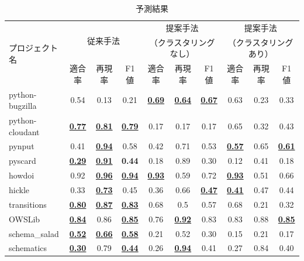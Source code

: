 \documentclass[T,J]{fose} %
\begin{document}
\begin{table}[t]
    \centering
    \caption{予測結果}
    \label{PrevPrediction}
    \begin{tabular}{l|ccc|ccc|ccc}
         \hline
         \multirow{3}{*}{プロジェクト名}&\multicolumn{3}{c|}{\multirow{2}{*}{従来手法}} & \multicolumn{3}{c|}{提案手法} & \multicolumn{3}{c}{提案手法}\\
         &\multicolumn{3}{c|}{} & \multicolumn{3}{c|}{（クラスタリングなし）} & \multicolumn{3}{c}{（クラスタリングあり）}\\ \cline{2-10}
          & 適合率 & 再現率 & F1値 & 適合率 & 再現率 & F1値 & 適合率 & 再現率 & F1値\\ \hline
         \hline %
            python-bugzilla & 0.54 & 0.13 & 0.21 & \textbf{\underline{0.69}} & \textbf{\underline{0.64}} & \textbf{\underline{0.67}} & 0.63 & 0.23 & 0.33\\
            python-cloudant & \textbf{\underline{0.77}} & \textbf{\underline{0.81}} & \textbf{\underline{0.79}} & 0.17 & 0.17 & 0.17 & 0.65 & 0.32 & 0.43\\
            pynput & 0.41 & \textbf{\underline{0.94}} & 0.58 & 0.42 & 0.71 & 0.53 & \textbf{\underline{0.57}} & 0.65 & \textbf{\underline{0.61}}\\
            pyscard & \textbf{\underline{0.29}} & \textbf{\underline{0.91}} & \textbf{0.44} & 0.18 & 0.89 & 0.30 & 0.12 & 0.41 & 0.18\\
            howdoi & 0.92 & \textbf{\underline{0.96}} & \textbf{\underline{0.94}} & \textbf{\underline{0.93}} & 0.59 & 0.72 & \textbf{\underline{0.93}} & 0.51 & 0.66\\
            hickle & 0.33 & \textbf{\underline{0.73}} & 0.45 & 0.36 & 0.66 & \textbf{\underline{0.47}} & \textbf{\underline{0.41}} & 0.47 & 0.44\\
            transitions & \textbf{\underline{0.80}} & \textbf{\underline{0.87}} & \textbf{\underline{0.83}} & 0.68 & 0.5 & 0.57 & 0.68 & 0.21 & 0.32\\
            OWSLib & \textbf{\underline{0.84}} & 0.86 & \textbf{\underline{0.85}} & 0.76 & \textbf{\underline{0.92}} & 0.83 & 0.83 & 0.88 & \textbf{\underline{0.85}}\\
            schema\_salad & \textbf{\underline{0.52}} & \textbf{\underline{0.66}} & \textbf{\underline{0.58}} & 0.21 & 0.52 & 0.30 & 0.15 & 0.21 & 0.17\\
            schematics & \textbf{\underline{0.30}} & 0.79 & \textbf{\underline{0.44}} & 0.26 & \textbf{\underline{0.94}} & 0.41 & 0.27 & 0.84 & 0.40\\
    \hline
    \end{tabular}
\end{table}
\end{document}

